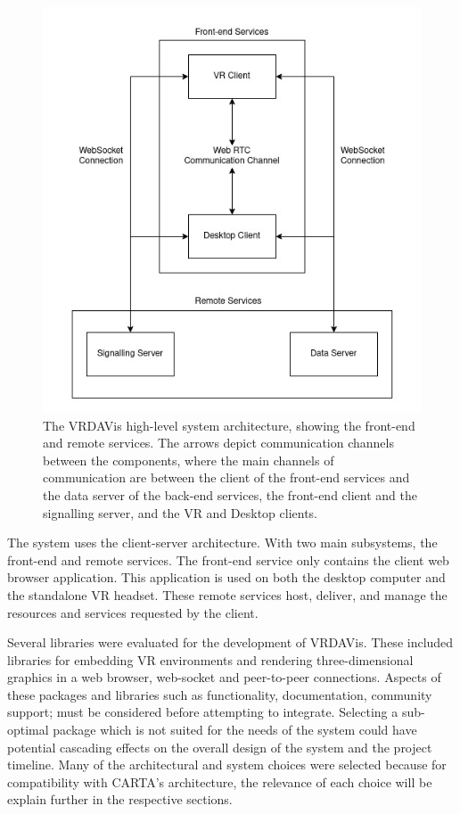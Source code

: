 \begin{figure}
    \centering
    \includegraphics[width=0.6\linewidth]{figures/system-diagram.jpg}
    \caption{The VRDAVis high-level system architecture, showing the front-end and remote services. The arrows depict communication channels between the components, where the main channels of communication are between the client of the front-end services and the data server of the back-end services, the front-end client and the signalling server, and the VR and Desktop clients.}
    \label{fig:system-diagram}
\end{figure}

The system uses the client-server architecture. 
With two main subsystems, the front-end and remote services.
The front-end service only contains the client web browser application.
This application is used on both the desktop computer and the standalone VR headset. 
These remote services host, deliver, and manage the resources and services requested by the client. 


Several libraries were evaluated for the development of VRDAVis. These included libraries for embedding VR environments and rendering three-dimensional graphics in a web browser, web-socket and peer-to-peer connections.
Aspects of these packages and libraries such as functionality, documentation, community support; must be considered before attempting to integrate.
Selecting a sub-optimal package which is not suited for the needs of the system could have potential cascading effects on the overall design of the system and the project timeline.
Many of the architectural and system choices were selected because for compatibility with CARTA's architecture, the relevance of each choice will be explain further in the respective sections.

